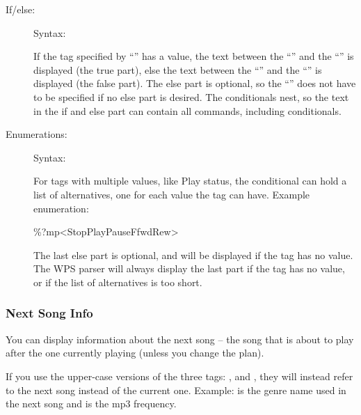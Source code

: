 \begin{description}
\item[If/else: ]
Syntax: 

If the tag specified by ``'' has a value, the text between the
``\config{{\textless}}'' and the ``\config{{\textbar}}'' is displayed (the true
part), else the text between the ``\config{{\textbar}}'' and the
``\config{{\textgreater}}'' is displayed (the false part).
The else part is optional, so the ``\config{{\textbar}}'' does not have to be
specified if no else part is desired. The conditionals nest, so the text in the
if and else part can contain all \config{\%} commands, including conditionals.

\item[Enumerations: ]
Syntax: 

For tags with multiple values, like Play status, the conditional can hold a
list of alternatives, one for each value the tag can have.
Example enumeration:
\begin{example}
     \%?mp{\textless}Stop{\textbar}Play{\textbar}Pause{\textbar}Ffwd{\textbar}Rew{\textgreater}
\end{example}

The last else part is optional, and will be displayed if the tag has no value.
The WPS parser will always display the last part if the tag has no value, or if
the list of alternatives is too short.
\end{description}

\subsubsection{Next Song Info}
You can display information about the next song -- the song that is
about to play after the one currently playing (unless you change the
plan).

If you use the upper-case versions of the
three tags: ,  and , they will instead refer to
the next song instead of the current one. Example:  is the genre
name used in the next song and  is the mp3 frequency.\\


